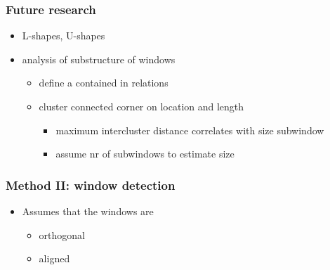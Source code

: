 \documentclass{beamer}
\begin{document}
\frame
{
	\frametitle{Future research}
	\begin{itemize}
	\item <+-| alert@+> L-shapes, U-shapes
	\item <+-| alert@+> analysis of substructure of windows
	\begin{itemize}
		\item <+-| alert@+> define a contained in relations
		\item <+-| alert@+> cluster connected corner on location and length
		\begin{itemize}
			\item <+-| alert@+> maximum intercluster distance correlates with size subwindow
			\item <+-| alert@+> assume nr of subwindows to estimate size
		\end{itemize}
	\end{itemize}
	\end{itemize}
}





\frame
{
	\frametitle{Method II: window detection}
	\begin{itemize}
	\item <+-| alert@+> Assumes that the windows are
	\begin{itemize}
		\item <+-| alert@+> orthogonal
		\item <+-| alert@+> aligned
	\end{itemize}
	\end{itemize}

}
\end{document}
